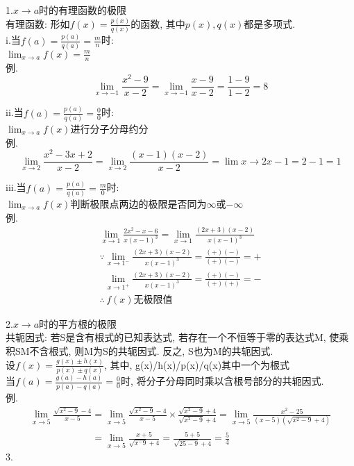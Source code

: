 \documentclass[UTF8, fontset=ubuntu]{ctexart}
\begin{document}
1.$x\to a$时的有理函数的极限\\
有理函数: 形如$f(x)=\frac{p(x)}{q(x)}$的函数, 其中$p(x),q(x)$都是多项式.\\
i.当$f(a)=\frac{p(a)}{q(a)}=\frac{m}{n}$时:\\
$\displaystyle\lim_{x\to a}f(x)=\frac{m}{n}$\\
例.
\[\lim_{x\to -1}\frac{x^2-9}{x-2}=\lim_{x\to -1}\frac{x-9}{x-2}=\frac{1-9}{1-2}=8\]

ii.当$f(a)=\frac{p(a)}{q(a)}=\frac{0}{0}$时:\\
$\displaystyle\lim_{x\to a}f(x)$进行分子分母约分\\
例.
\[\lim_{x\to 2}\frac{x^2-3x+2}{x-2}=\lim_{x\to 2}\frac{(x-1)(x-2)}{x-2}=\lim{x\to 2}x-1=2-1=1\]

iii.当$f(a)=\frac{p(a)}{q(a)}=\frac{m}{0}$时:\\
$\displaystyle\lim_{x\to a}f(x)$判断极限点两边的极限是否同为$\infty$或$-\infty$\\
例.
\begin{displaymath}
\begin{array}{l}
    \displaystyle\lim_{x\to 1}\frac{2x^2-x-6}{x(x-1)^3}=\lim_{x\to 1}\frac{(2x+3)(x-2)}{x(x-1)^3}\\
	\displaystyle\mathbf{\because}\lim_{x\to 1^-}\frac{(2x+3)(x-2)}{x(x-1)^3}=\frac{(+)(-)}{(+)(-)}=+\\
    \displaystyle\phantom{\because}\lim_{x\to 1^+}\frac{(2x+3)(x-2)}{x(x-1)^3}=\frac{(+)(-)}{(+)(+)}=-\\
	\displaystyle\mathbf{\therefore}\,f(x)\text{无极限值}
\end{array}
\end{displaymath}\vspace{2ex}

2.$x\to a$时的平方根的极限\\
共轭因式: 若S是含有根式的已知表达式, 若存在一个不恒等于零的表达式M, 使乘积SM不含根式, 则M为S的共轭因式. 反之, S也为M的共轭因式.\\
设$f(x)=\frac{g(x)\pm h(x)}{p(x)\pm q(x)}$, 其中, g(x)/h(x)/p(x)/q(x)其中一个为根式\\
当$f(a)=\frac{g(a)-h(a)}{p(a)-q(a)}=\frac{0}{0}$时, 将分子分母同时乘以含根号部分的共轭因式.\\
例.
\begin{displaymath}
\begin{array}{l}
    \displaystyle\lim_{x\to 5}\frac{\sqrt{x^2-9}-4}{x-5}=\lim_{x\to 5}\frac{\sqrt{x^2-9}-4}{x-5}\times\frac{\sqrt{x^2-9}+4}{\sqrt{x^2-9}+4}=\lim_{x\to 5}\frac{x^2-25}{(x-5)(\sqrt{x^2-9}+4)}\\
    \displaystyle\phantom{\lim_{x\to 5}\frac{\sqrt{x^2-9}-4}{x-5}}=\lim_{x\to 5}\frac{x+5}{\sqrt{x^-9}+4}=\frac{5+5}{\sqrt{25-9}+4}=\frac{5}{4}
\end{array}
\end{displaymath}\vspace{2ex}
3.
\end{document}
